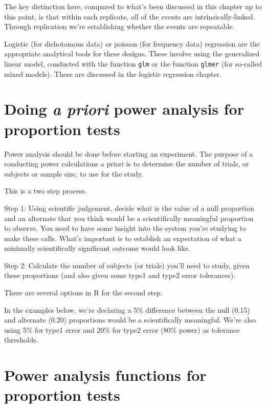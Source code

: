 \documentclass[]{book}
\begin{document}
The key distinction here, compared to what's been discussed in this chapter up to this point, is that within each replicate, all of the events are intrinsically-linked. Through replication we're establishing whether the events are repeatable.

Logistic (for dichotomous data) or poisson (for frequency data) regression are the appropriate analytical tools for these designs. These involve using the generalized linear model, conducted with the function \texttt{glm} or the function \texttt{glmer} (for so-called mixed models). These are discussed in the logistic regression chapter.

\hypertarget{doing-a-priori-power-analysis-for-proportion-tests}{%
\section{\texorpdfstring{Doing \emph{a priori} power analysis for proportion tests}{Doing a priori power analysis for proportion tests}}\label{doing-a-priori-power-analysis-for-proportion-tests}}

Power analysis should be done before starting an experiment. The purpose of a conducting power calculations a priori is to determine the number of trials, or subjects or sample size, to use for the study.

This is a two step process.

Step 1: Using scientific judgement, decide what is the value of a null proportion and an alternate that you think would be a scientifically meaningful proportion to observe. You need to have some insight into the system you're studying to make these calls. What's important is to establish an expectation of what a minimally scientifically significant outcome would look like.

Step 2: Calculate the number of subjects (or trials) you'll need to study, given these proportions (and also given some type1 and type2 error tolerances).

There are several options in R for the second step.

In the examples below, we're declaring a 5\% difference between the null (0.15) and alternate (0.20) proportions would be a scientifically meaningful. We're also using 5\% for type1 error and 20\% for type2 error (80\% power) as tolerance thresholds.

\hypertarget{power-analysis-functions-for-proportion-tests}{%
\section{Power analysis functions for proportion tests}\label{power-analysis-functions-for-proportion-tests}}
\end{document}

